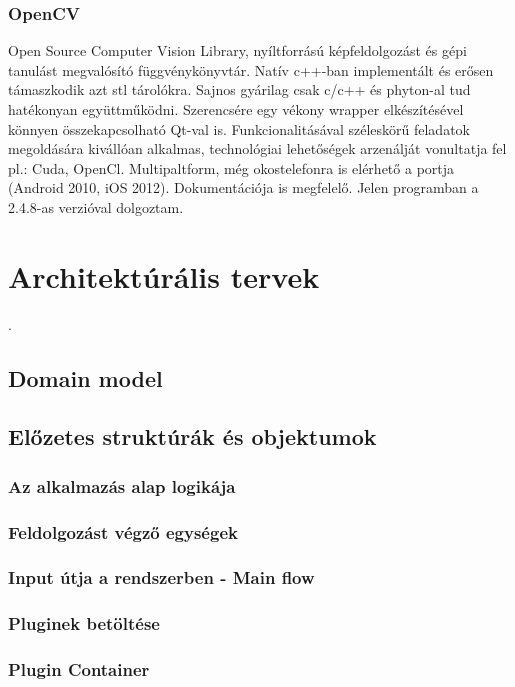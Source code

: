 \documentclass[a4paper,12pt,oneside]{report}
\begin{document}
\subsubsection{OpenCV}	
Open Source Computer Vision Library, nyíltforrású képfeldolgozást és gépi tanulást megvalósító függvénykönyvtár.\cite{website:opencv_about} Natív c++-ban implementált és erősen támaszkodik azt stl tárolókra. Sajnos gyárilag csak c/c++ és phyton-al tud hatékonyan együttműködni. Szerencsére egy vékony wrapper elkészítésével könnyen összekapcsolható Qt-val is. Funkcionalitásával széleskörű feladatok megoldására kivállóan alkalmas, technológiai lehetőségek arzenálját vonultatja fel pl.: Cuda, OpenCl. Multipaltform, még okostelefonra is elérhető a portja (Android 2010, iOS 2012). Dokumentációja is megfelelő. Jelen programban a 2.4.8-as verzióval dolgoztam.


\section{Architektúrális tervek}
.

\subsection{Domain model}

\subsection{Előzetes struktúrák és objektumok}

\subsubsection{Az alkalmazás alap logikája}
\subsubsection{Feldolgozást végző egységek}
\subsubsection{Input útja a rendszerben - Main flow}
\subsubsection{Pluginek betöltése}
\subsubsection{Plugin Container}
\end{document}
